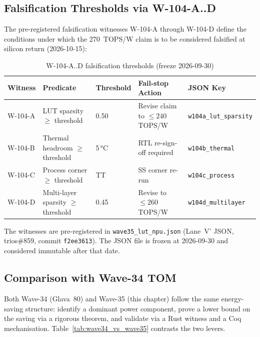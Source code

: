 \subsection{Falsification Thresholds via W-104-A..D}

The pre-registered falsification witnesses W-104-A through W-104-D define
the conditions under which the 270~TOPS/W claim is to be considered
falsified at silicon return (2026-10-15):

\begin{table}[ht]
\centering
\caption{W-104-A..D falsification thresholds (freeze 2026-09-30)}
\label{tab:falsification_thresholds}
\begin{tabular}{lllll}
\hline
Witness & Predicate & Threshold & Fail-stop Action & JSON Key \\
\hline
W-104-A & LUT sparsity $\geq$ threshold & 0.50 & Revise claim to $\leq 240$ TOPS/W & \texttt{w104a\_lut\_sparsity} \\
W-104-B & Thermal headroom $\geq$ threshold & 5\,°C & RTL re-sign-off required & \texttt{w104b\_thermal} \\
W-104-C & Process corner $\geq$ threshold & TT & SS corner re-run & \texttt{w104c\_process} \\
W-104-D & Multi-layer sparsity $\geq$ threshold & 0.45 & Revise to $\leq 260$ TOPS/W & \texttt{w104d\_multilayer} \\
\hline
\end{tabular}
\end{table}

The witnesses are pre-registered in \texttt{wave35\_lut\_npu.json}
(Lane~V' JSON, trios\#859, commit \texttt{f2ee3613}).  The JSON file
is frozen at 2026-09-30 and considered immutable after that date.

\subsection{Comparison with Wave-34 TOM}

Both Wave-34 (Glava~80) and Wave-35 (this chapter) follow the same
energy-saving structure: identify a dominant power component, prove a lower
bound on the saving via a rigorous theorem, and validate via a Rust witness
and a Coq mechanisation.  Table~\ref{tab:wave34_vs_wave35} contrasts the two
levers.

